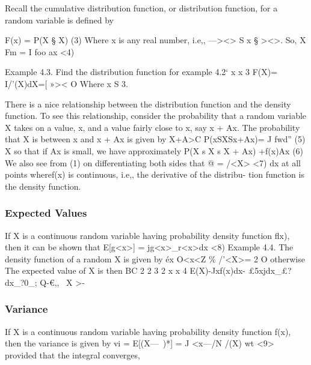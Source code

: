Recall the cumulative distribution function, or distribution function, for
a random variable is deﬁned by


F(x) = P(X § X) (3)
Where x is any real number, i.e,, —><> S x § ><>. So,
X
Fm = I foo ax <4)

Example 4.3. Find the distribution function for example 4.2‘
x x 3
F(X)= I/'(X)dX=[%
»>< O
Where x S 3.

There is a nice relationship between the distribution function and
the density function. To see this relationship, consider the probability
that a random variable X takes on a value, x, and a value fairly close to
x, say x + Ax.
The probability that X is between x and x + Ax is given by
X+A>C
P(xSXSx+Ax)= J fwd” (5)
X
so that if Ax is small, we have approximately
P(X s X s X + Ax) +f(x)Ax (6)
We also see from (1) on differentiating both sides that
@ = /<X> <7)
dx
at all points wheref(x) is continuous, i.e,, the derivative of the distribu-
tion function is the density function.


\subsubsection*{Expected Values}
If X is a continuous random variable having probability density function
ﬂx), then it can be shown that
E[g<x>] = jg<x>_r<x>dx <8)
Example 4.4. The density function of a random X is given by
éx O<x<Z \%
/'<X>=  2%
O otherwise
The expected value of X is then
BC 2 2 3 2
x x 4
E(X)-Jxf(x)dx- £5xjdx_£?dx_?0_;
Q-€,,~
X
>-

\subsubsection*{Variance}
If X is a continuous random variable having probability density function
f(x), then the variance is given by
vi = E[(X—~)*] = J <x—/N /(X) wt <9>
provided that the integral converges,

